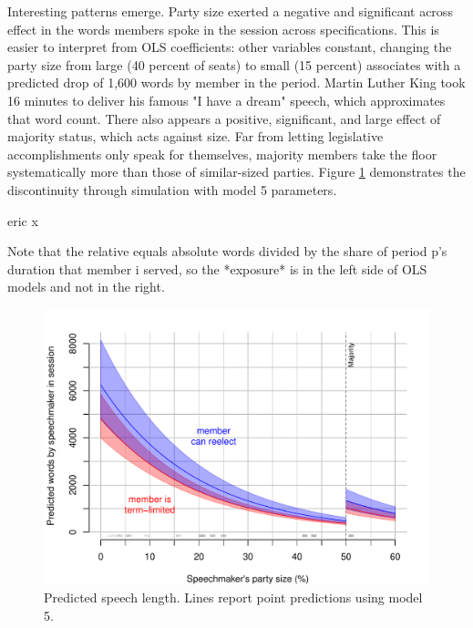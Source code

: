 \documentclass[letter,12pt]{article}
\begin{document}
Interesting patterns emerge. Party size exerted a negative and significant across effect in the words members spoke in the session across specifications. This is easier to interpret from OLS coefficients: other variables constant, changing the party size from large (40 percent of seats) to small (15 percent) associates with a predicted drop of 1,600 words by member in the period. Martin Luther King took 16 minutes to deliver his famous "I have a dream" speech, which approximates that word count. There also appears a positive, significant, and large effect of majority status, which acts against size. Far from letting legislative accomplishments only speak for themselves, majority members take the floor systematically more than those of similar-sized parties. Figure \ref{F:predict} demonstrates the discontinuity through simulation with model 5 parameters. 

eric  x

Note that the relative equals absolute words divided by the share of period p's duration that member i served, so the *exposure* is in the left side of OLS models and not in the right. 





\begin{figure}
  \centering
    \includegraphics[width=.67\columnwidth]{../plots/predictedWords.pdf}
    \caption{Predicted speech length. Lines report point predictions using model 5.}\label{F:predict}
\end{figure}
\end{document}
